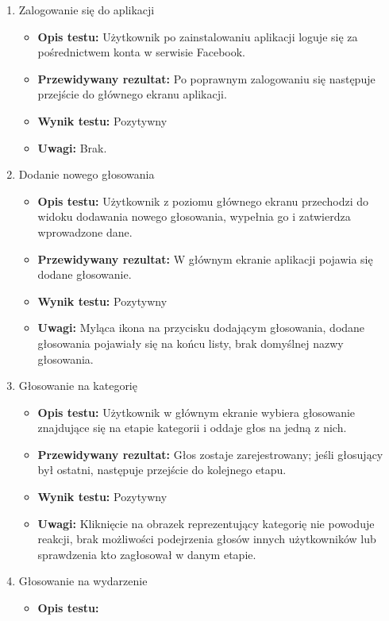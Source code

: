 \documentclass[10pt,a4paper]{article}
\begin{document}
\begin{enumerate}
	\item Zalogowanie się do aplikacji
		\begin{itemize}
			\item \textbf{Opis testu:}
				Użytkownik po zainstalowaniu aplikacji loguje się za pośrednictwem
				konta w serwisie Facebook.
			\item \textbf{Przewidywany rezultat:}
				Po poprawnym zalogowaniu się następuje przejście do głównego ekranu
				aplikacji.
			\item \textbf{Wynik testu:} Pozytywny
			\item \textbf{Uwagi:} Brak.
		\end{itemize}
	\item Dodanie nowego głosowania
		\begin{itemize}
			\item \textbf{Opis testu:}
				Użytkownik z poziomu głównego ekranu przechodzi do widoku dodawania
				nowego głosowania, wypełnia go i zatwierdza wprowadzone dane.
			\item \textbf{Przewidywany rezultat:}
				W głównym ekranie aplikacji pojawia się dodane głosowanie.
			\item \textbf{Wynik testu:} Pozytywny
			\item \textbf{Uwagi:}
				Myląca ikona na przycisku dodającym głosowania, dodane głosowania
				pojawiały się na końcu listy, brak domyślnej nazwy głosowania.
		\end{itemize}
	\item Głosowanie na kategorię
		\begin{itemize}
			\item \textbf{Opis testu:}
				Użytkownik w głównym ekranie wybiera głosowanie znajdujące się na
				etapie kategorii i oddaje głos na jedną z nich.
			\item \textbf{Przewidywany rezultat:}
				Głos zostaje zarejestrowany; jeśli głosujący był ostatni, następuje
				przejście do kolejnego etapu.
			\item \textbf{Wynik testu:} Pozytywny
			\item \textbf{Uwagi:}
				Kliknięcie na obrazek reprezentujący kategorię nie powoduje reakcji,
				brak możliwości podejrzenia głosów innych użytkowników lub sprawdzenia
				kto zagłosował w danym etapie.
		\end{itemize}
	\item Głosowanie na wydarzenie
		\begin{itemize}
			\item \textbf{Opis testu:}

\end{itemize}
\end{enumerate}
\end{document}
